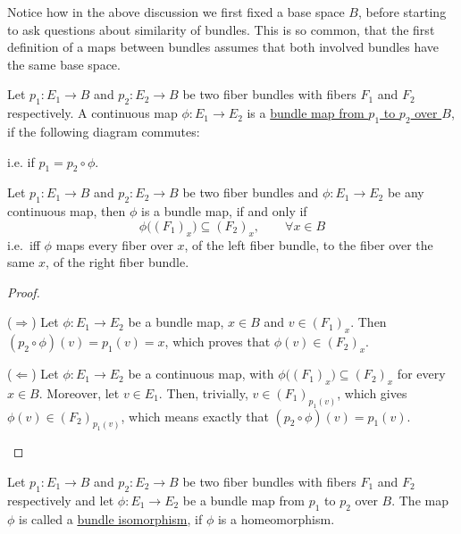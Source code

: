 Notice how in the above discussion we first fixed a base space $B$, before starting to ask questions about similarity of bundles. This is so common, that the first definition of a maps between bundles assumes that both involved bundles have the same base space.
\begin{definition}
Let $p_1:E_1\to B$ and $p_2:E_2\to B$ be two fiber bundles with fibers $F_1$ and $F_2$ respectively. A continuous map $\phi:E_1\to E_2$ is a \ul{bundle map from $p_1$ to $p_2$ over $B$}, if the following diagram commutes:
\begin{center}
\end{center}
i.e. if $p_1=p_2\circ\phi$.
\end{definition}

\begin{proposition}\label{prop:fiberwise}
Let $p_1:E_1\to B$ and $p_2:E_2\to B$ be two fiber bundles and $\phi:E_1\to E_2$ be any continuous map, then $\phi$ is a bundle map, if and only if
\[\phi\big({(F_1)}_x\big)\subseteq{(F_2)}_x,\qquad\forall x\in B\]
i.e.\ iff $\phi$ maps every fiber over $x$, of the left fiber bundle, to the fiber over the same $x$, of the right fiber bundle.
\end{proposition}
\begin{proof}
\begin{b_item}
\item[($\Rightarrow$)] Let $\phi:E_1\to E_2$ be a bundle map, $x\in B$ and $v\in {(F_1)}_x$. Then $(p_2\circ\phi)(v)=p_1(v)=x$, which proves that $\phi(v)\in{(F_2)}_x$.
\item[($\Leftarrow$)] Let $\phi:E_1\to E_2$ be a continuous map, with $\phi\big({(F_1)}_x\big)\subseteq{(F_2)}_x$ for every $x\in B$. Moreover, let $v\in E_1$. Then, trivially, $v\in {(F_1)}_{p_1(v)}$, which gives $\phi(v)\in {(F_2)}_{p_1(v)}$, which means exactly that $(p_2\circ\phi)(v)=p_1(v)$.\qedhere
\end{b_item}
\end{proof}

\begin{definition}
Let $p_1:E_1\to B$ and $p_2:E_2\to B$ be two fiber bundles with fibers $F_1$ and $F_2$ respectively and let $\phi:E_1\to E_2$ be a bundle map from $p_1$ to $p_2$ over $B$. The map $\phi$ is called a \ul{bundle isomorphism}, if $\phi$ is a homeomorphism.
\end{definition}

